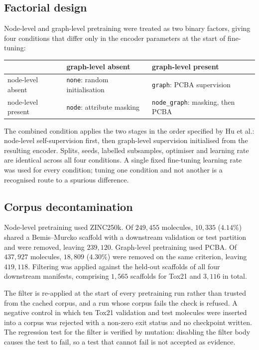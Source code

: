 \documentclass[11pt,a4paper]{article}
\begin{document}
\subsection{Factorial design}

Node-level and graph-level pretraining were treated as two binary factors,
giving four conditions that differ only in the encoder parameters at the start of
fine-tuning:

\begin{center}
\small
\begin{tabular}{lll}
\toprule
 & graph-level absent & graph-level present \\
\midrule
node-level absent  & \texttt{none}: random initialisation & \texttt{graph}: PCBA supervision \\
node-level present & \texttt{node}: attribute masking     & \texttt{node\_graph}: masking, then PCBA \\
\bottomrule
\end{tabular}
\end{center}

The combined condition applies the two stages in the order specified by
Hu et al.: node-level self-supervision first, then graph-level supervision
initialised from the resulting encoder. Splits, seeds, labelled subsamples,
optimiser and learning rate are identical across all four conditions. A single
fixed fine-tuning learning rate was used for every condition; tuning one
condition and not another is a recognised route to a spurious difference.

\subsection{Corpus decontamination}

Node-level pretraining used ZINC250k. Of $249{,}455$ molecules, $10{,}335$
($4.14\%$) shared a Bemis--Murcko scaffold with a downstream validation or test
partition and were removed, leaving $239{,}120$. Graph-level pretraining used
PCBA. Of $437{,}927$ molecules, $18{,}809$ ($4.30\%$) were removed on the same
criterion, leaving $419{,}118$. Filtering was applied against the held-out
scaffolds of all four downstream manifests, comprising $1{,}565$ scaffolds for
Tox21 and $3{,}116$ in total.

The filter is re-applied at the start of every pretraining run rather than
trusted from the cached corpus, and a run whose corpus fails the check is
refused. A negative control in which ten Tox21 validation and test molecules
were inserted into a corpus was rejected with a non-zero exit status and no
checkpoint written. The regression test for the filter is verified by mutation:
disabling the filter body causes the test to fail, so a test that cannot fail is
not accepted as evidence.
\end{document}
